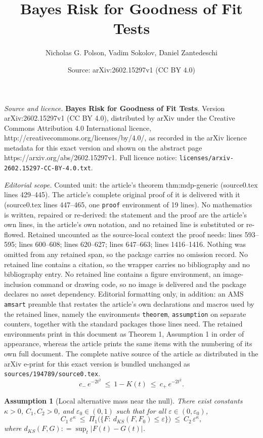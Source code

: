 \documentclass[10pt,a4paper]{amsart}
\title{\textbf{Bayes Risk for Goodness of Fit Tests}}
\author{Nicholas G. Polson, Vadim Sokolov, Daniel Zantedeschi}
\date{Source: arXiv:2602.15297v1 (CC BY 4.0)}
\newtheorem{assumption}{Assumption}
\newcommand{\defeq}{\mathrel{\mathop:}=}
\begin{document}
\maketitle

\noindent\emph{Source and licence.} \textbf{Bayes Risk for Goodness of Fit Tests}. Version arXiv:2602.15297v1 (CC BY 4.0), distributed by arXiv under the Creative Commons Attribution 4.0 International licence, http://creativecommons.org/licenses/by/4.0/, as recorded in the arXiv licence metadata for this exact version and shown on the abstract page https://arxiv.org/abs/2602.15297v1. Full licence notice: \texttt{licenses/arxiv-2602.15297-CC-BY-4.0.txt}.\par\smallskip

\noindent\textit{Editorial scope.} Counted unit: the article's theorem thm:mdp-generic (source0.tex lines 429--445). The article's complete original proof of it is delivered with it (source0.tex lines 447--465, one \texttt{proof} environment of 19 lines). No mathematics is written, repaired or re-derived: the statement and the proof are the article's own lines, in the article's own notation, and no retained line is substituted or re-flowed.  Retained uncounted as the source-local context the proof needs: lines 593--595; lines 600--608; lines 620--627; lines 647--663; lines 1416--1416.  Nothing was omitted from any retained span, so the package carries no omission record.  No retained line contains a citation, so the wrapper carries no bibliography and no bibliography entry.  No retained line contains a figure environment, an image-inclusion command or drawing code, so no image is delivered and the package declares no asset dependency.  Editorial formatting only, in addition: an AMS \texttt{amsart} preamble that restates the article's own declarations and macros used by the retained lines, namely the environments \texttt{theorem}, \texttt{assumption} on separate counters, together with the standard packages those lines need.  The retained environments print in this document as Theorem 1, Assumption 1 in order of appearance, whereas the article prints the same items with the numbering of its own full document.  The complete native source of the article as distributed in the arXiv e-print for this exact version is bundled unchanged as \texttt{sources/194789/source0.tex}.
\begin{equation}\label{eq:kolmogorov-tail-2sided}
c_-\,e^{-2t^2}\ \le\ 1-K(t)\ \le\ c_+\,e^{-2t^2}.
\end{equation}

\begin{assumption}[Local alternative mass near the null]\label{ass:prior-local}
There exist constants $\kappa>0$, $C_1,C_2>0$, and $\varepsilon_0\in(0,1)$ such that for all $\varepsilon\in(0,\varepsilon_0)$,
\begin{equation}\label{eq:local-mass}
C_1\,\varepsilon^{\kappa}\ \le\
\Pi_1\!\big(\{F:\ d_{KS}(F,F_0)\le \varepsilon\}\big)
\ \le\ C_2\,\varepsilon^{\kappa},
\end{equation}
where $d_{KS}(F,G)\defeq \sup_t|F(t)-G(t)|$.
\end{assumption}
\end{document}
